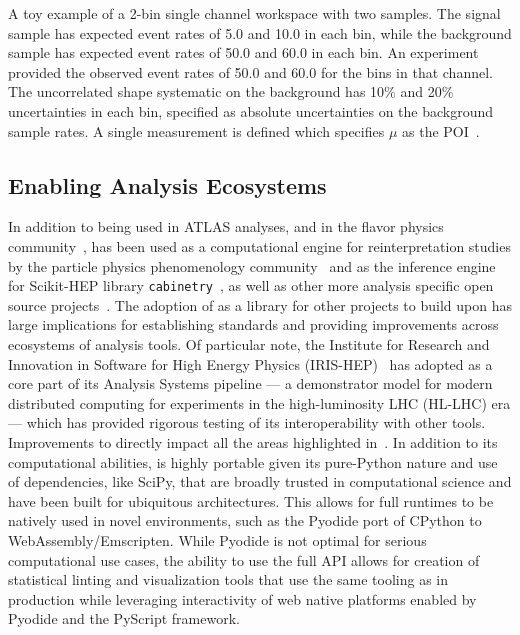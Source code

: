 \begin{listing}
 \inputminted{json}{src/code/toy_example.json}
 \caption{A toy example of a 2-bin single channel workspace with two samples.
  The signal sample has expected event rates of 5.0 and 10.0 in each bin, while the background sample has expected event rates of 50.0 and 60.0 in each bin.
  An experiment provided the observed event rates of 50.0 and 60.0 for the bins in that channel.
  The uncorrelated shape systematic on the background has 10\% and 20\% uncertainties in each bin, specified as absolute uncertainties on the background sample rates.
  A single measurement is defined which specifies $\mu$ as the POI~\cite{ATL-PHYS-PUB-2019-029}.}
 \label{lst:example:2binchannel}
\end{listing}

\subsection{Enabling Analysis Ecosystems}\label{subsec:analysis_ecosystems}

In addition to being used in ATLAS analyses, and in the flavor physics community~\cite{Belle-II:2021rof,Belle:2022gbl}, \pyhf{} has been used as a computational engine for reinterpretation studies by the particle physics phenomenology community~\cite{Alguero:2020grj,Alguero:2020yhu} and as the inference engine for Scikit-HEP library \texttt{cabinetry}~\cite{cabinetry}, as well as other more analysis specific open source projects~\cite{abcd_pyhf,Simpson:2022suz}.
The adoption of \pyhf{} as a library for other projects to build upon has large implications for establishing standards and providing improvements across ecosystems of analysis tools.
Of particular note, the Institute for Research and Innovation in Software for High Energy Physics (IRIS-HEP)~\cite{iris-hep} has adopted \pyhf{} as a core part of its Analysis Systems pipeline --- a demonstrator model for modern distributed computing for experiments in the high-luminosity LHC (HL-LHC) era --- which has provided rigorous testing of its interoperability with other tools.
Improvements to \pyhf{} directly impact all the areas highlighted in~.
In addition to its computational abilities, \pyhf{} is highly portable given its pure-Python nature and use of dependencies, like SciPy, that are broadly trusted in computational science and have been built for ubiquitous architectures.
This allows for full \pyhf{} runtimes to be natively used in novel environments, such as the Pyodide port of CPython to WebAssembly/Emscripten.
While Pyodide is not optimal for serious computational use cases, the ability to use the full \pyhf{} API allows for creation of statistical linting and visualization tools that use the same tooling as in production while leveraging interactivity of web native platforms enabled by Pyodide and the PyScript framework.

